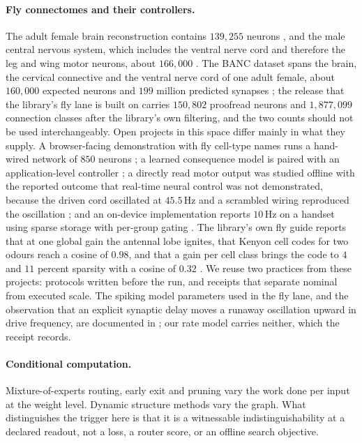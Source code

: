 \documentclass[11pt]{article}
\theoremstyle{remark}
\begin{document}
\paragraph{Fly connectomes and their controllers.}
The adult female brain reconstruction contains $139{,}255$ neurons \cite{dorkenwald2024}, and the
male central nervous system, which includes the ventral nerve cord and therefore the leg and wing
motor neurons, about $166{,}000$ \cite{male-cns}. The BANC dataset spans the brain, the cervical connective and the ventral nerve cord of
one adult female, about $160{,}000$ expected neurons and $199$ million predicted synapses
\cite{banc2024}; the release that the library's fly lane is built on carries $150{,}802$ proofread
neurons and $1{,}877{,}099$ connection classes after the library's own filtering, and the two counts
should not be used interchangeably. Open
projects in this space differ mainly in what they supply. A browser-facing demonstration with fly
cell-type names runs a hand-wired network of $850$ neurons \cite{flynets}; a learned consequence
model is paired with an application-level controller \cite{cadencedemos}; a directly read motor
output was studied offline with the reported outcome that real-time neural control was not
demonstrated, because the driven cord oscillated at $45.5$\,Hz and a scrambled wiring reproduced
the oscillation \cite{therealfly}; and an on-device implementation reports $10$\,Hz on a handset
using sparse storage with per-group gating \cite{flyharmony}. The library's own fly guide reports
that at one global gain the antennal lobe ignites, that Kenyon cell codes for two odours reach a
cosine of $0.98$, and that a gain per cell class brings the code to $4$ and $11$ percent sparsity
with a cosine of $0.32$ \cite{cadence-connectomes}. We reuse two practices from these projects:
protocols written before the run, and receipts that separate nominal from executed scale. The
spiking model parameters used in the fly lane, and the observation that an explicit synaptic delay
moves a runaway oscillation upward in drive frequency, are documented in \cite{shiu2024,vaxenburg2025};
our rate model carries neither, which the receipt records.

\paragraph{Conditional computation.}
Mixture-of-experts routing, early exit and pruning vary the work done per input at the weight
level. Dynamic structure methods vary the graph. What distinguishes the trigger here is that it is
a witnessable indistinguishability at a declared readout, not a loss, a router score, or an offline
search objective.
\end{document}
